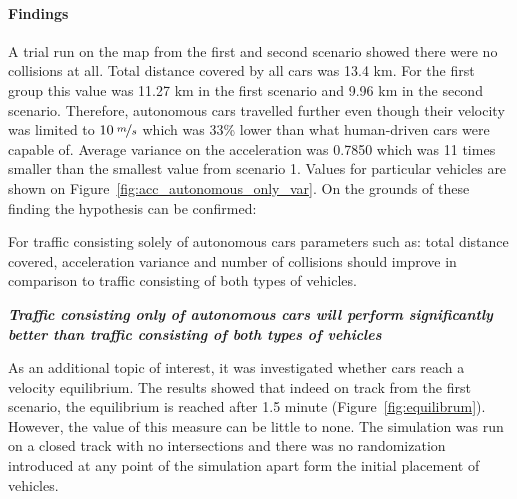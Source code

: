 \documentclass[11pt,english]{article}
\begin{document}
\paragraph{Findings}

A trial run on the map from the first and second scenario showed there were no collisions at all. Total distance covered by all cars was 13.4 km. For the first group this value was 11.27 km in the first scenario and 9.96 km in the second scenario. Therefore, autonomous cars travelled further even though their velocity was limited to $10\:\nicefrac{m}{s}$ which was 33\% lower than what human-driven cars were capable of. Average variance on the acceleration was 0.7850 which was 11 times smaller than the smallest value from scenario 1. Values for particular vehicles are shown on Figure~\ref{fig:acc_autonomous_only_var}. On the grounds of these finding the hypothesis can be confirmed:


For traffic consisting solely of autonomous cars parameters such as: total distance covered, acceleration variance and number of collisions should improve in comparison to traffic consisting of both types of vehicles.


\textit{\textbf{Traffic consisting only of autonomous cars will perform significantly better than traffic consisting of both types of vehicles}}


\par

As an additional topic of interest, it was investigated whether cars reach a velocity equilibrium. The results showed that indeed on track from the first scenario, the equilibrium is reached after 1.5 minute (Figure~\ref{fig:equilibrum}). However, the value of this measure can be little to none. The simulation was run on a closed track with no intersections and there was no randomization introduced at any point of the simulation apart form the initial placement of vehicles. 

\end{document}
